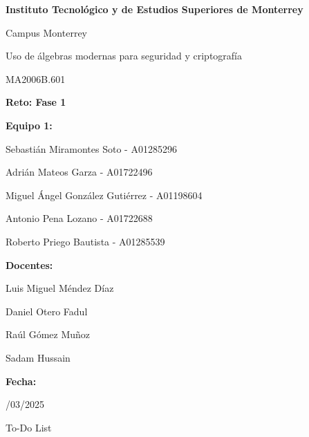 \documentclass[a4paper,12pt]{article}
\begin{document}
\begin{center}


\textbf{{\large {\selectfont Instituto Tecnológico y de Estudios Superiores de Monterrey}}}



\end{center}


\begin{center}

{\selectfont Campus Monterrey}
\end{center}


\begin{center}
{\selectfont Uso de álgebras modernas para seguridad y criptografía}
\end{center}
\begin{center}
{\selectfont MA2006B.601}
\end{center}

\begin{center}
\textbf{{\Huge {\selectfont Reto: Fase 1}}}
\end{center}

\begin{center}
{\selectfont \textbf{Equipo 1:}}

{\selectfont Sebastián Miramontes Soto - A01285296}

{\selectfont Adrián Mateos Garza - A01722496}

{\selectfont Miguel Ángel González Gutiérrez - A01198604}

{\selectfont Antonio Pena Lozano - A01722688}

{\selectfont Roberto Priego Bautista - A01285539}
\end{center}

\begin{center}
{\selectfont \textbf{Docentes:}}

{\selectfont Luis Miguel Méndez Díaz}

{\selectfont Daniel Otero Fadul}

{\selectfont Raúl Gómez Muñoz}

{\selectfont Sadam Hussain}



{\selectfont \textbf{Fecha:}}

{/03/2025}



\end{center}
\pagebreak
{\Large {\selectfont To-Do List}}
\end{document}
